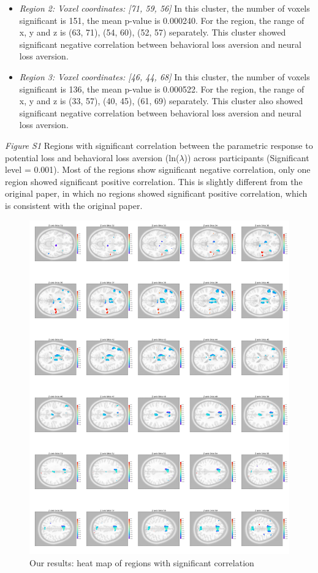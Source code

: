 \documentclass[11pt]{article}
\begin{document}
\begin{itemize}
\item \emph{Region 2: Voxel coordinates: [71, 59, 56]} In this cluster, the number of voxels significant is 151, the mean p-value is 0.000240. For the region, the range of x, y and z is (63, 71), (54, 60), (52, 57) separately. This cluster showed significant negative correlation between behavioral loss aversion and neural loss aversion.
\item \emph{Region 3: Voxel coordinates: [46, 44, 68]} In this cluster, the number of voxels significant is 136, the mean p-value is 0.000522. For the region, the range of x, y and z is (33, 57), (40, 45), (61, 69) separately. This cluster also showed significant negative correlation between behavioral loss aversion and neural loss aversion.

\end{itemize}

\newpage

\emph{Figure S1} Regions with significant correlation between the parametric response to potential loss and behavioral loss aversion (ln($\lambda$)) across participants (Significant level = 0.001).  Most of the regions show significant negative correlation, only one region showed significant positive correlation. This is slightly different from the original paper, in which no regions showed significant positive correlation, which is consistent with the original paper.

\begin{figure}[H]
    \centering
        \includegraphics[scale=0.1]{figures/Regression3/sig_cor_z_loss.png}
    \caption{Our results: heat map of regions with significant correlation}
\end{figure}
\end{document}
